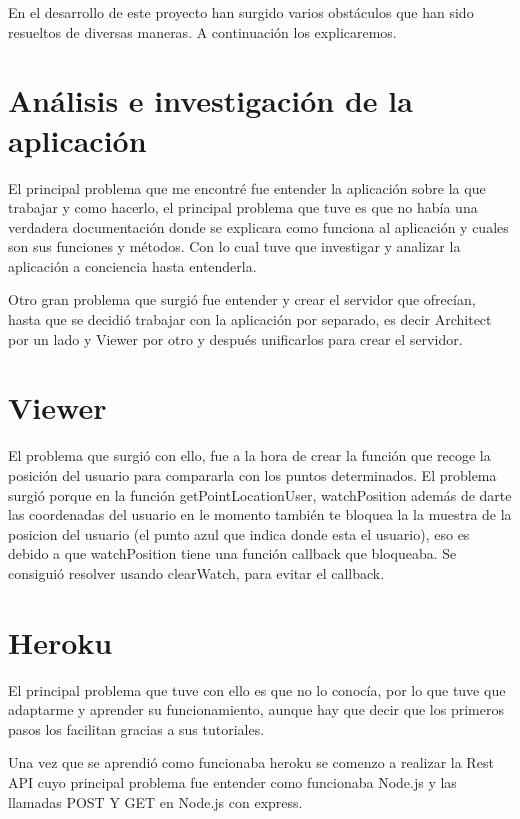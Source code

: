 
En el desarrollo de este proyecto han surgido varios obstáculos que han sido resueltos de diversas maneras. A continuación los explicaremos.

\section{Análisis e investigación de la aplicación }\label{analisis-investigacion}

El principal problema que me encontré fue entender la aplicación sobre la que trabajar y como hacerlo, el principal problema que tuve es que no había una verdadera documentación donde se explicara como funciona al aplicación y cuales son sus funciones y métodos. Con lo cual tuve que investigar y analizar la aplicación a conciencia hasta entenderla.

Otro gran problema que surgió fue entender y crear el servidor que ofrecían, hasta que se decidió trabajar con la aplicación por separado, es decir Architect por un lado y Viewer por otro y después unificarlos para crear el servidor. 

\section{Viewer}\label{viewer}

El problema que surgió con ello, fue a  la hora de crear la función que recoge la posición del usuario para compararla con los puntos determinados. El problema surgió porque en la función getPointLocationUser, watchPosition además de darte las coordenadas del usuario en le momento también te bloquea la la muestra de la posicion del usuario (el punto azul que indica donde esta el usuario), eso es debido a que watchPosition tiene una función callback que bloqueaba. Se consiguió resolver usando clearWatch, para evitar el callback.

\section{Heroku}\label{Heroku}

El principal problema que tuve con ello es que no lo conocía, por lo que tuve que adaptarme y aprender su funcionamiento, aunque hay que decir que los primeros pasos los facilitan gracias a sus tutoriales.

Una vez que se aprendió como funcionaba heroku se comenzo a realizar la Rest API cuyo principal problema fue entender como funcionaba Node.js y las llamadas POST Y GET en Node.js con express.

